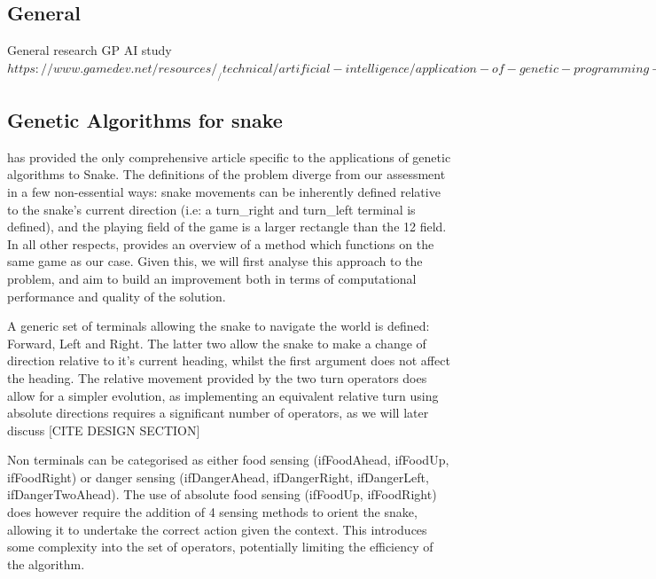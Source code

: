 \documentclass[british,10pt,a4paper]{article}
\begin{document}
\subsection{General}
General research 
GP AI study 
\(https://www.gamedev.net/resources/_/technical/artificial-intelligence/application-of-genetic-programming-to-the-snake-r1175\) 

\subsection{Genetic Algorithms for snake}
\citet{Ehlis2000-sz} has provided the only comprehensive article specific to the applications of genetic algorithms to Snake. The definitions of the problem diverge from our assessment in a few non-essential ways: snake movements can be inherently defined relative to the snake's current direction (i.e: a turn\_right and turn\_left terminal is defined), and the playing field of the game is a larger rectangle than the 12 field. In all other respects, \citeauthor{Ehlis2000-sz} provides
an overview of a method which functions on the same game as our case. Given this, we will first analyse this approach to the problem, and aim to build an improvement both in terms of computational performance and quality of the solution. \newline

A generic set of terminals allowing the snake to navigate the world is defined: Forward, Left and Right. The latter two allow the snake to make a change of direction relative to it's current heading, whilst the first argument does not affect the heading. The relative movement provided by the two turn operators does allow for a simpler evolution, as implementing an equivalent relative turn using absolute directions requires a significant number of operators, as we will later discuss [CITE DESIGN SECTION] \newline

Non terminals can be categorised as either food sensing (ifFoodAhead, ifFoodUp, ifFoodRight) or danger sensing (ifDangerAhead, ifDangerRight, ifDangerLeft, ifDangerTwoAhead). The use of absolute food sensing (ifFoodUp, ifFoodRight) does however require the addition of 4 sensing methods to orient the snake, allowing it to undertake the correct action given the context. This introduces some complexity into the set of operators, potentially limiting the efficiency of the algorithm.\newline
\end{document}
